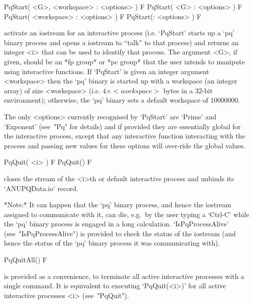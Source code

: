 
\>PqStart( <G>, <workspace> : <options> ) F
\>PqStart( <G> : <options> ) F
\>PqStart( <workspace> : <options> ) F
\>PqStart(: <options> ) F

activate an iostream for an interactive {\ANUPQ} process (i.e.  `PqStart'
starts up a `pq' binary process and opens a {\GAP} iostream  to  ``talk''
to that process) and returns an integer <i> that can be used to  identify
that process. The argument <G>, if given, should be an *fp group* or  *pc
group* that the user  intends  to  manipute  using  interactive  {\ANUPQ}
functions. If `PqStart' is given an integer argument <workspace> then the
`pq' binary is started up with a workspace (an  integer  array)  of  size
<workspace> (i.e. $4 \times <workspace>$ bytes in a 32-bit  environment);
otherwise, the `pq' binary sets a default workspace of $10000000$.

The only <options> currently recognised  by  `PqStart'  are  `Prime'  and
`Exponent' (see~"Pq" for details) and if provided  they  are  essentially 
global for the interactive {\ANUPQ} process, except that any  interactive
function interacting with the process and passing new  values  for  these
options will over-ride the global values.

\>PqQuit( <i> ) F
\>PqQuit() F

closes the stream of the <i>th or default  interactive  {\ANUPQ}  process
and unbinds its `ANUPQData.io' record.

*Note:*
It can happen that the `pq' binary process, and hence the {\GAP} iostream
assigned to communicate with it, can  die,  e.g.~by  the  user  typing  a
`Ctrl-C' while the `pq' binary process is engaged in a long  calculation.
`IsPqProcessAlive' (see~"IsPqProcessAlive")  is  provided  to  check  the
status of the {\GAP} iostream (and hence the status of  the  `pq'  binary
process it was communicating with).

\>PqQuitAll() F

is provided  as  a  convenience,  to  terminate  all  active  interactive
{\ANUPQ} processes with a single command. It is equivalent  to  executing
`PqQuit(<i>)'  for  all  active  interactive   {\ANUPQ}   processes   <i>
(see~"PqQuit").


